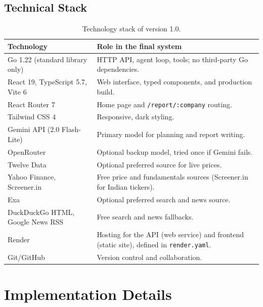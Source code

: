 \documentclass[12pt,a4paper,oneside]{report}
\begin{document}
\subsection{Technical Stack}
\begin{table}[H]\centering\small
\begin{tabularx}{\textwidth}{>{\raggedright\arraybackslash}p{3.5cm}X}
\toprule \textbf{Technology} & \textbf{Role in the final system}\\\midrule
Go 1.22 (standard library only) & HTTP API, agent loop, tools; no third-party Go dependencies.\\
React 19, TypeScript 5.7, Vite 6 & Web interface, typed components, and production build.\\
React Router 7 & Home page and \texttt{/report/:company} routing.\\
Tailwind CSS 4 & Responsive, dark styling.\\
Gemini API (2.0 Flash-Lite) & Primary model for planning and report writing.\\
OpenRouter & Optional backup model, tried once if Gemini fails.\\
Twelve Data & Optional preferred source for live prices.\\
Yahoo Finance, Screener.in & Free price and fundamentals sources (Screener.in for Indian tickers).\\
Exa & Optional preferred search and news source.\\
DuckDuckGo HTML, Google News RSS & Free search and news fallbacks.\\
Render & Hosting for the API (web service) and frontend (static site), defined in \texttt{render.yaml}.\\
Git/GitHub & Version control and collaboration.\\
\bottomrule
\end{tabularx}
\caption{Technology stack of version 1.0.}
\label{tab:stack}
\end{table}

\section{Implementation Details}
\end{document}
